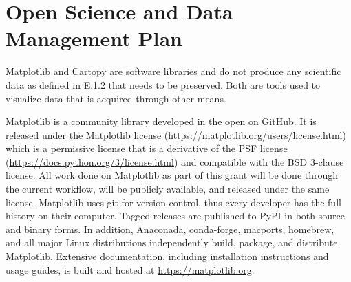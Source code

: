 \documentclass[12pt]{article}
\numberwithin{page}{section}
\begin{document}
\def\sovast{\ref@jnl{Soviet~Ast.}}      %
\def\ssr{\ref@jnl{Space~Sci.~Rev.}}     %
\def\zap{\ref@jnl{ZAp}}                 %
\def\nat{\ref@jnl{Nature}}              %
\def\iaucirc{\ref@jnl{IAU~Circ.}}       %
\def\aplett{\ref@jnl{Astrophys.~Lett.}} %
\def\apspr{\ref@jnl{Astrophys.~Space~Phys.~Res.}}
\def\bain{\ref@jnl{Bull.~Astron.~Inst.~Netherlands}}
\def\fcp{\ref@jnl{Fund.~Cosmic~Phys.}}  %
\def\gca{\ref@jnl{Geochim.~Cosmochim.~Acta}}   %
\def\grl{\ref@jnl{Geophys.~Res.~Lett.}} %
\def\jcp{\ref@jnl{J.~Chem.~Phys.}}      %
\def\jgr{\ref@jnl{J.~Geophys.~Res.}}    %
\def\jqsrt{\ref@jnl{J.~Quant.~Spec.~Radiat.~Transf.}}
\def\memsai{\ref@jnl{Mem.~Soc.~Astron.~Italiana}}
\def\nphysa{\ref@jnl{Nucl.~Phys.~A}}   %
\def\physrep{\ref@jnl{Phys.~Rep.}}   %
\def\physscr{\ref@jnl{Phys.~Scr}}   %
\def\planss{\ref@jnl{Planet.~Space~Sci.}}   %
\def\procspie{\ref@jnl{Proc.~SPIE}}   %

\let\astap=\aap
\let\apjlett=\apjl
\let\apjsupp=\apjs
\let\applopt=\ao

\let\oldbibsection\bibsection
\renewcommand\bibsection{\oldbibsection\setcounter{page}{1}}



\newpage

\section{Open Science and Data Management Plan}
\setcounter{page}{1}

Matplotlib and Cartopy are software libraries and do not produce any scientific
data as defined in E.1.2 that needs to be preserved.  Both are tools used to
visualize data that is acquired through other means.

Matplotlib is a community library developed in the open on GitHub.
It is released under the Matplotlib license
(\url{https://matplotlib.org/users/license.html}) which is a permissive
license that is a derivative of the PSF license
(\url{https://docs.python.org/3/license.html}) and compatible with the
BSD 3-clause license.  All work done on Matplotlib as part of this grant will
be done through the current workflow, will be publicly available, and
released under the same license.  Matplotlib uses git for version
control, thus every developer has the full history on their computer.  Tagged releases
are published to PyPI in both source and binary forms.  In
addition, Anaconada, conda-forge, macports, homebrew, and all major Linux
distributions independently build, package, and distribute Matplotlib.
Extensive documentation, including installation instructions
and usage guides, is built and hosted at \url{https://matplotlib.org}.
\end{document}
